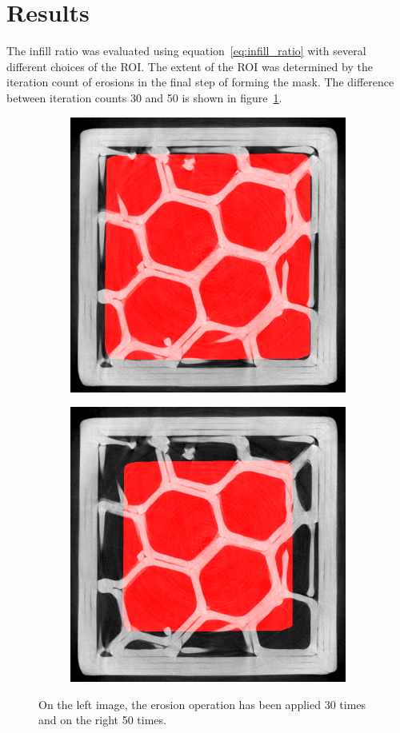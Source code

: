 \documentclass[a4paper,twoside,12pt]{article}
\begin{document}
\section{Results}
The infill ratio was evaluated using equation~\eqref{eq:infill_ratio} with several different choices of the ROI. The extent of the ROI was determined by the iteration count of erosions in the final step of forming the mask. The difference between iteration counts 30 and 50 is shown in figure~\ref{fig:erosion_count}.
\begin{figure}
    \centering
    \begin{subfigure}{0.5\textwidth}
        \centering
        \includegraphics[width=0.8\linewidth]{images/eroded_24.png}
    \end{subfigure}%
    \begin{subfigure}{0.5\textwidth}
        \centering
        \includegraphics[width=0.8\linewidth]{images/eroded_24_50.png}
    \end{subfigure}
    \caption{On the left image, the erosion operation has been applied 30 times and on the right 50 times.}
    \label{fig:erosion_count}
\end{figure}
\end{document}
